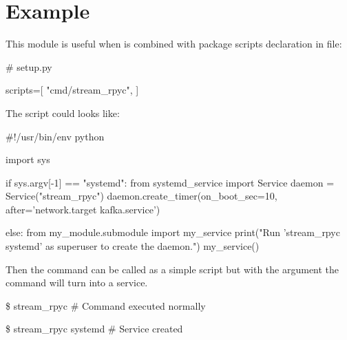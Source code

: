 \section{Example}
This module is useful when is combined with package scripts declaration in  file:
\begin{python}
# setup.py

scripts=[
    "cmd/stream_rpyc",
]
\end{python}
The script could looks like:
\begin{python}
#!/usr/bin/env python

import sys

if sys.argv[-1] == "systemd":
    from systemd_service import Service
    daemon = Service("stream_rpyc")
    daemon.create_timer(on_boot_sec=10, after='network.target kafka.service')

else:
    from my_module.submodule import my_service
    print("Run 'stream_rpyc systemd' as superuser to create the daemon.")
    my_service()
\end{python}
Then the command can be called as a simple script but with the  argument the command will turn into a service.
\begin{python}
\$ stream_rpyc
# Command executed normally
\end{python}
\begin{python}
\$ stream_rpyc systemd
# Service created
\end{python}